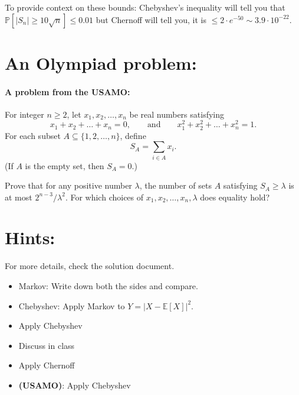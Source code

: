 \documentclass[12pt]{article}
\newcommand{\EE}{\mathbb{E}}
\newcommand{\PP}{\mathbb{P}}
\begin{document}
To provide context on these bounds: Chebyshev's inequality will tell you that $\PP[|S_n|\ge 10\sqrt{n}]\le 0.01$ but Chernoff will tell you, it is $\le 2\cdot e^{-50}\sim 3.9\cdot 10^{-22}$.

\section*{An Olympiad problem:}

\paragraph*{A problem from the USAMO:} 
For integer $n\geq2$, let $x_1, x_2, \ldots, x_n$ be real numbers satisfying\[x_1+x_2+\ldots+x_n=0, \qquad \text{and}\qquad x_1^2+x_2^2+\ldots+x_n^2=1.\]For each subset $A\subseteq\{1, 2, \ldots, n\}$, define\[S_A=\sum_{i\in A}x_i.\](If $A$ is the empty set, then $S_A=0$.)

Prove that for any positive number $\lambda$, the number of sets $A$ satisfying $S_A\geq\lambda$ is at most $2^{n-3}/\lambda^2$. For which choices of $x_1, x_2, \ldots, x_n, \lambda$ does equality hold?

\eject


\section*{Hints:}

For more details, check the solution document.

\begin{itemize}
    \item Markov: Write down both the sides and compare.
    \item Chebyshev: Apply Markov to $Y=|X-\EE[X]|^2$.
    \item Apply Chebyshev
    \item Discuss in class
    \item Apply Chernoff
    \item \textbf{(USAMO)}: Apply Chebyshev
\end{itemize}
\end{document}
